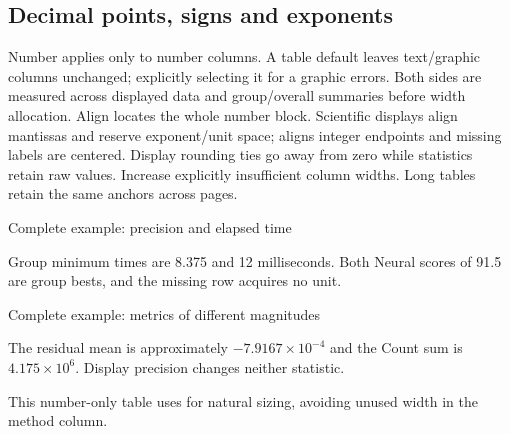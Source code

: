 \subsection{Decimal points, signs and exponents}
Number  applies only to number columns. A table default leaves
text/graphic columns unchanged; explicitly selecting it for a graphic errors.
Both sides are measured across displayed data and group/overall summaries before
width allocation. Align locates the whole number block. Scientific displays
align mantissas and reserve exponent/unit space;  aligns integer
endpoints and missing labels are centered. Display rounding ties go away from
zero while statistics retain raw values. Increase explicitly insufficient
column widths. Long tables retain the same anchors across pages.
\begin{demo}{Complete example: precision and elapsed time}
\begin{center}
\begin{gradtable}[align=c,header align=c,data=precision,width=\linewidth,style=research,theme=teal,
  formatter=siunitx,group by=family,rank scope=group,group summary=true,
  sort keys={score/descending,time/ascending}]
\end{gradtable}
\end{center}
\end{demo}
Group minimum times are 8.375 and 12 milliseconds. Both Neural scores of 91.5
are group bests, and the missing row acquires no unit.
\begin{demo}{Complete example: metrics of different magnitudes}
\begin{center}
\begin{gradtable}[align=c,header align=c,data=magnitudes,style=research,theme=violet,
  width=0pt,text width=20mm,column sep=6pt,
  row stretch=1.15,row padding=1pt]
\end{gradtable}
\end{center}
\end{demo}
The residual mean is approximately $-7.9167\times10^{-4}$ and the Count sum is
$4.175\times10^6$. Display precision changes neither statistic.

This number-only table uses  for natural sizing, avoiding unused width in the method column.
